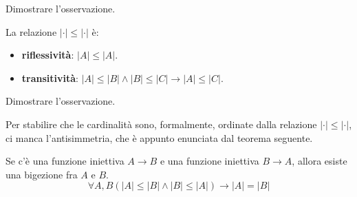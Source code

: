 \documentclass[11pt]{scrartcl}
\begin{document}
\begin{exercise}
	Dimostrare l'osservazione.
\end{exercise}

\begin{remark}
	La relazione $|\cdot| \leq |\cdot|$ è:
	\begin{itemize}
		\item \textbf{riflessività}: $|A| \leq |A|$.
		\item \textbf{transitività}: $|A| \leq |B| \land |B| \leq |C| \rightarrow |A| \leq |C|$.
	\end{itemize}
\end{remark}

\begin{exercise}
	Dimostrare l'osservazione.
\end{exercise}

Per stabilire che le cardinalità sono, formalmente, ordinate dalla relazione $|\cdot| \leq |\cdot|$, ci manca l'antisimmetria, che è appunto enunciata dal teorema seguente.

\begin{theorem}
	\label{CB}
	Se c'è una funzione iniettiva $A \rightarrow B$ e una funzione iniettiva $B \rightarrow A$, allora esiste una bigezione fra $A$ e $B$.
	\[ \forall A,B (|A| \leq |B| \land |B| \leq |A|) \rightarrow |A| = |B|
		\]
\end{theorem}
\end{document}
